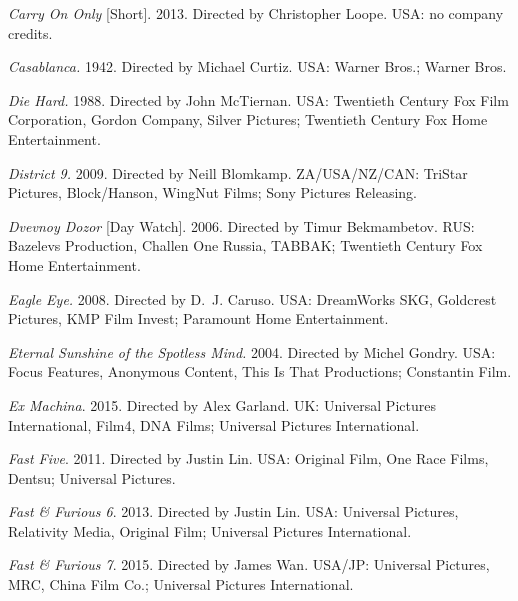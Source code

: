 \medskip\noindent\textit{Carry On Only} [Short]. 2013. Directed by Christopher Loope. USA: no company credits.



\medskip\noindent\textit{Casablanca.} 1942. Directed by Michael Curtiz. USA: Warner Bros.; Warner Bros.



\medskip\noindent\textit{Die Hard.} 1988. Directed by John McTiernan. USA: Twentieth Century Fox Film Corporation, Gordon Company, Silver Pictures; Twentieth Century Fox Home Entertainment.



\medskip\noindent\textit{District 9.} 2009. Directed by Neill Blomkamp. ZA/USA/NZ/CAN: TriStar Pictures, Block/Hanson, WingNut Films; Sony Pictures Releasing.



\medskip\noindent\textit{Dvevnoy Dozor} [Day Watch]. 2006. Directed by Timur Bekmambetov. RUS: Bazelevs Production, Challen One Russia, TABBAK; Twentieth Century Fox Home Entertainment.



\medskip\noindent\textit{Eagle Eye.} 2008. Directed by D.~J. Caruso. USA: DreamWorks SKG, Goldcrest Pictures, KMP Film Invest; Paramount Home Entertainment.



\medskip\noindent\textit{Eternal Sunshine of the Spotless Mind.} 2004. Directed by Michel Gondry. USA: Focus Features, Anonymous Content, This Is That Productions; Constantin Film.



\medskip\noindent\textit{Ex Machina}. 2015. Directed by Alex Garland. UK: Universal Pictures International, Film4, DNA Films; Universal Pictures International.



\medskip\noindent\textit{Fast Five}. 2011. Directed by Justin Lin. USA: Original Film, One Race Films, Dentsu; Universal Pictures.



\medskip\noindent\textit{Fast \& Furious 6}. 2013. Directed by Justin Lin. USA: Universal Pictures, Relativity Media, Original Film; Universal Pictures International.



\medskip\noindent\textit{Fast \& Furious 7}. 2015. Directed by James Wan. USA/JP: Universal Pictures, MRC, China Film Co.; Universal Pictures International.



